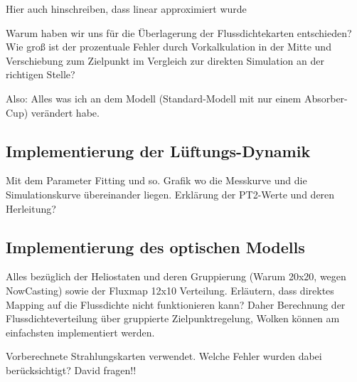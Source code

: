 Hier auch hinschreiben, dass linear approximiert wurde

Warum haben wir uns für die Überlagerung der Flussdichtekarten entschieden?
Wie groß ist der prozentuale Fehler durch Vorkalkulation in der Mitte und Verschiebung zum Zielpunkt im Vergleich zur direkten Simulation an der richtigen Stelle?

Also: Alles was ich an dem Modell (Standard-Modell mit nur einem Absorber-Cup) verändert habe.

\subsection{Implementierung der Lüftungs-Dynamik} \label{subsec_ImplementierungFan}
Mit dem Parameter Fitting und so.
Grafik wo die Messkurve und die Simulationskurve übereinander liegen.
Erklärung der PT2-Werte und deren Herleitung?

\subsection{Implementierung des optischen Modells} \label{subsec_Modells}
Alles bezüglich der Heliostaten und deren Gruppierung (Warum 20x20, wegen NowCasting) sowie der Fluxmap 12x10 Verteilung.
Erläutern, dass direktes Mapping auf die Flussdichte nicht funktionieren kann?
Daher Berechnung der Flussdichteverteilung über gruppierte Zielpunktregelung, Wolken können am einfachsten implementiert werden.

Vorberechnete Strahlungskarten verwendet.
Welche Fehler wurden dabei berücksichtigt? David fragen!!